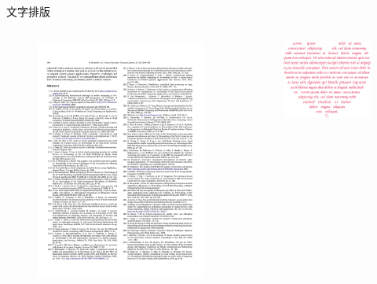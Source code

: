 \documentclass{beamer}
\begin{document}
\begin{frame}{文字排版}
  \begin{columns}
    \begin{column}{.45\textwidth}
      \begin{figure}[h]
        \centering
        \includegraphics[width=.8\textwidth]{pic/references.pdf}
      \end{figure}
    \end{column}
    \begin{column}{.45\textwidth}
      \begin{figure}[h]
        \centering
        \includegraphics[width=.8\textwidth]{pic/shapepar.pdf}
      \end{figure}
    \end{column}
  \end{columns}
\end{frame}
\end{document}
